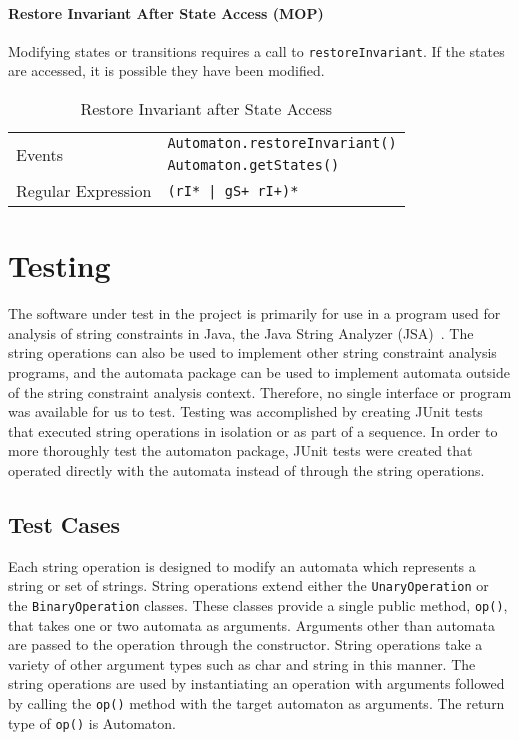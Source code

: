 \documentclass[letterpaper,sigplan]{acmart}
\begin{document}
\paragraph{Restore Invariant After State Access (MOP)} Modifying states or
transitions requires a call to \lstinline{restoreInvariant}.  If the states are
accessed, it is possible they have been modified.

\begin{table}[h]
  {\footnotesize
    \begin{tabular}{ll}
      \toprule
      \multirow{2}{*}{Events} & \texttt{Automaton.restoreInvariant()} \\
                              & \texttt{Automaton.getStates()} \\
      \midrule
      Regular Expression & \texttt{(rI* | gS+ rI+)*} \\
      \midrule
    \end{tabular}
    \caption{Restore Invariant after State Access}%
    \label{tab:restore-invariant-after-state-access}
  }
\end{table}

\section{Testing}\label{sec:testing}

The software under test in the project is primarily for use in a program used
for analysis of string constraints in Java, the Java String Analyzer
(JSA)~\cite{strings2003}.  The string operations can also be used to implement
other string constraint analysis programs, and the automata package can be used
to implement automata outside of the string constraint analysis context.
Therefore, no single interface or program was available for us to test.
Testing was accomplished by creating JUnit tests that executed string
operations in isolation or as part of a sequence.  In order to more thoroughly
test the automaton package, JUnit tests were created that operated directly
with the automata instead of through the string operations.

\subsection{Test Cases}\label{sec:testing-cases}

Each string operation is designed to modify an automata which represents a
string or set of strings.  String operations extend either the
\lstinline{UnaryOperation} or the \lstinline{BinaryOperation} classes.  These
classes provide a single public method, \lstinline{op()}, that takes one or two
automata as arguments.  Arguments other than automata are passed to the
operation through the constructor.  String operations take a variety of other
argument types such as char and string in this manner.  The string operations
are used by instantiating an operation with arguments followed by calling the
\lstinline{op()} method with the target automaton as arguments.  The return
type of \lstinline{op()} is Automaton.
\end{document}
